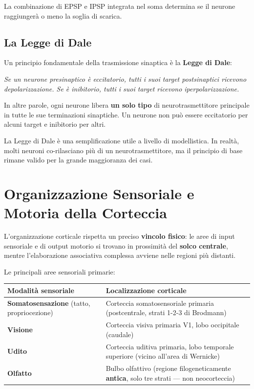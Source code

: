 La combinazione di EPSP e IPSP integrata nel soma determina se il neurone raggiungerà o meno la soglia di scarica.

\subsection{La Legge di Dale}

Un principio fondamentale della trasmissione sinaptica è la \textbf{Legge di Dale}:

\begin{tcolorbox}[colback=colorE!40, colframe=colorE, arc=2mm, boxrule=0.5pt]
\textit{Se un neurone presinaptico è eccitatorio, tutti i suoi target postsinaptici ricevono depolarizzazione. Se è inibitorio, tutti i suoi target ricevono iperpolarizzazione.}
\end{tcolorbox}

In altre parole, ogni neurone libera \textbf{un solo tipo} di neurotrasmettitore principale in tutte le sue terminazioni sinaptiche. Un neurone non può essere eccitatorio per alcuni target e inibitorio per altri.

 La Legge di Dale è una semplificazione utile a livello di modellistica. In realtà, molti neuroni co-rilasciano più di un neurotrasmettitore, ma il principio di base rimane valido per la grande maggioranza dei casi.


\newpage

\section{Organizzazione Sensoriale e Motoria della Corteccia}

L'organizzazione corticale rispetta un preciso \textbf{vincolo fisico}: le aree di input sensoriale e di output motorio si trovano in prossimità del \textbf{solco centrale}, mentre l'elaborazione associativa complessa avviene nelle regioni più distanti.

Le principali aree sensoriali primarie:

\begin{table}[htbp]
    \centering
    \renewcommand{\arraystretch}{1.3}
    \begin{tabularx}{\textwidth}{|l|X|}
    \hline
    \textbf{Modalità sensoriale} & \textbf{Localizzazione corticale} \\
    \hline
    \textbf{Somatosensazione} (tatto, propriocezione) & Corteccia somatosensoriale primaria (postcentrale, strati 1-2-3 di Brodmann) \\
    \textbf{Visione} & Corteccia visiva primaria V1, lobo occipitale (caudale) \\
    \textbf{Udito} & Corteccia uditiva primaria, lobo temporale superiore (vicino all'area di Wernicke) \\
    \textbf{Olfatto} & Bulbo olfattivo (regione filogeneticamente \textbf{antica}, solo tre strati — non neocorteccia) \\
    \hline
    \end{tabularx}
\end{table}

